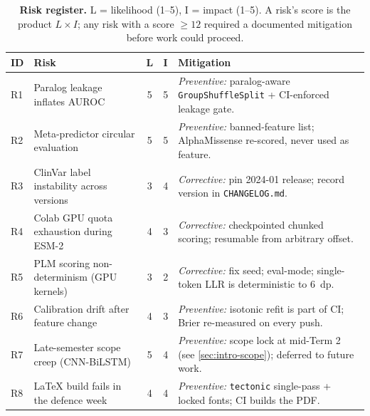 \documentclass[11pt,a4paper,oneside]{report}
\begin{document}
\begin{table}[htbp]
\centering
\footnotesize
\begin{tabularx}{\linewidth}{@{}l X c c X@{}}
\toprule
\textbf{ID} & \textbf{Risk} & \textbf{L} & \textbf{I} & \textbf{Mitigation} \\
\midrule
R1 & Paralog leakage inflates AUROC          & 5 & 5 & \emph{Preventive:} paralog-aware \texttt{GroupShuffleSplit} + CI-enforced leakage gate. \\
R2 & Meta-predictor circular evaluation      & 5 & 5 & \emph{Preventive:} banned-feature list; AlphaMissense re-scored, never used as feature. \\
R3 & ClinVar label instability across versions & 3 & 4 & \emph{Corrective:} pin 2024-01 release; record version in \texttt{CHANGELOG.md}. \\
R4 & Colab GPU quota exhaustion during ESM-2 & 4 & 3 & \emph{Corrective:} checkpointed chunked scoring; resumable from arbitrary offset. \\
R5 & PLM scoring non-determinism (GPU kernels) & 3 & 2 & \emph{Corrective:} fix seed; eval-mode; single-token LLR is deterministic to 6~dp. \\
R6 & Calibration drift after feature change & 4 & 3 & \emph{Preventive:} isotonic refit is part of CI; Brier re-measured on every push. \\
R7 & Late-semester scope creep (CNN-BiLSTM)   & 5 & 4 & \emph{Preventive:} scope lock at mid-Term 2 (see \ref{sec:intro-scope}); deferred to future work. \\
R8 & LaTeX build fails in the defence week   & 4 & 4 & \emph{Preventive:} \texttt{tectonic} single-pass + locked fonts; CI builds the PDF. \\
\bottomrule
\end{tabularx}
\caption[Risk register]{\textbf{Risk register.} L =
likelihood (1--5), I = impact (1--5). A risk's score is the
product $L\times I$; any risk with a score $\geq 12$
required a documented mitigation before work could proceed.}
\label{tab:risks}
\end{table}
\end{document}
